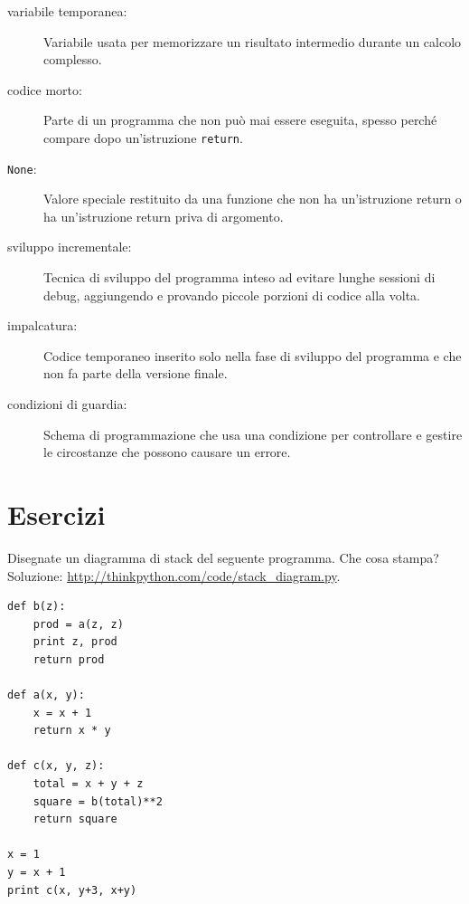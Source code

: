 \documentclass[10pt]{book}
\begin{document}
\begin{description}

\item[variabile temporanea:]  Variabile usata per memorizzare un risultato intermedio durante un calcolo complesso.

\item[codice morto:]  Parte di un programma che non può mai essere eseguita, spesso perché compare dopo un'istruzione {\tt return}.

\item[{\tt None}:]  Valore speciale restituito da una funzione che non ha
          un'istruzione return o ha un'istruzione return priva di argomento.

\item[sviluppo incrementale:]  Tecnica di sviluppo del programma inteso ad evitare lunghe sessioni di debug, aggiungendo e provando piccole porzioni di codice alla volta.

\item[impalcatura:]  Codice temporaneo inserito solo nella fase di sviluppo del programma e che non fa parte della versione finale.

\item[condizioni di guardia:]  Schema di programmazione che usa una condizione per controllare e gestire le circostanze che possono causare un errore.

\end{description}


\section{Esercizi}

\begin{exercise}

Disegnate un diagramma di stack del seguente programma. Che cosa stampa?
Soluzione: \url{http://thinkpython.com/code/stack_diagram.py}.

\begin{verbatim}
def b(z):
    prod = a(z, z)
    print z, prod
    return prod

def a(x, y):
    x = x + 1
    return x * y

def c(x, y, z):
    total = x + y + z
    square = b(total)**2
    return square

x = 1
y = x + 1
print c(x, y+3, x+y)
\end{verbatim}

\end{exercise}
\end{document}
